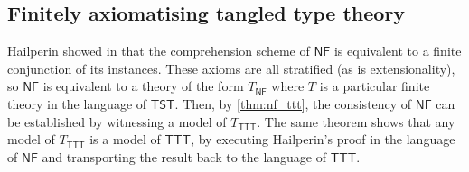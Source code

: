\subsection{Finitely axiomatising tangled type theory}

Hailperin showed in \cite{hailperin-finite-axiomatisation} that the comprehension scheme of \( \mathsf{NF} \) is equivalent to a finite conjunction of its instances.
These axioms are all stratified (as is extensionality), so \( \mathsf{NF} \) is equivalent to a theory of the form \( T_{\mathsf{NF}} \) where \( T \) is a particular finite theory in the language of \( \mathsf{TST} \).
Then, by \cref{thm:nf_ttt}, the consistency of \( \mathsf{NF} \) can be established by witnessing a model of \( T_{\mathsf{TTT}} \).
The same theorem shows that any model of \( T_{\mathsf{TTT}} \) is a model of \( \mathsf{TTT} \), by executing Hailperin's proof in the language of \( \mathsf{NF} \) and transporting the result back to the language of \( \mathsf{TTT} \).

